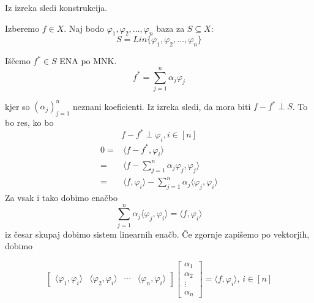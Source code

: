 \documentclass[a4paper,12pt]{article}
\newcommand{\innerproduct}[2]{\langle #1, #2 \rangle}
\theoremstyle{definition}
\theoremstyle{remark}
\begin{document}
Iz izreka sledi konstrukcija.

Izberemo $f \in X$. Naj bodo $\varphi_1, \varphi_2, \dots, \varphi_n$ baza za $S \subseteq X$:
\begin{equation*}
    S = Lin\{\varphi_1, \varphi_2, \dots, \varphi_n\}
\end{equation*}

Iščemo $f^* \in S$ ENA po MNK.
\begin{equation*}
    f^* = \sum_{j = 1}^{n} \alpha_j \varphi_j
\end{equation*}

kjer so $(\alpha_j)_{j = 1}^n$ neznani koeficienti. Iz izreka sledi, da mora biti $f - f^* \perp S$. To bo res, ko bo
\begin{equation*}
    f - f^* \perp \varphi_i, i \in [n]
\end{equation*}
\begin{align*}
    0 =& \innerproduct{f - f^*}{\varphi_i}\\
      =& \innerproduct{f - \sum_{j = 1}^{n}\alpha_j \varphi_j}{\varphi_j}\\
      =& \innerproduct{f}{\varphi_i} - \sum_{j = 1}^{n}\alpha_j \innerproduct{\varphi_j}{\varphi_i}
\end{align*}
Za vsak i tako dobimo enačbo
\begin{equation*}
    \sum_{j = 1}^{n} \alpha_j \innerproduct{\varphi_j}{\varphi_i} = \innerproduct{f}{\varphi_i}
\end{equation*}
iz česar skupaj dobimo sistem linearnih enačb. Če zgornje zapišemo po vektorjih, dobimo

\begin{equation*}
    \begin{bmatrix}
        \innerproduct{\varphi_1}{\varphi_i} & \innerproduct{\varphi_2}{\varphi_i} & \cdots & \innerproduct{\varphi_n}{\varphi_i}
    \end{bmatrix}
    \begin{bmatrix}
        \alpha_1 \\
        \alpha_2 \\
        \vdots \\
        \alpha_n
    \end{bmatrix}
    =
    \innerproduct{f}{\varphi_i} \text{, } i \in [n]
\end{equation*}
\end{document}
